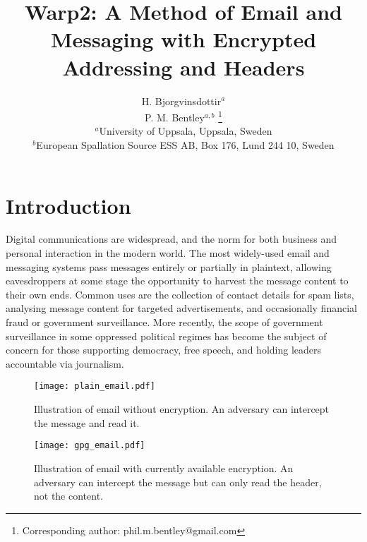 \pdfoutput=1 \documentclass{article}
\title{Warp2: A Method of Email and Messaging with Encrypted Addressing and Headers}
\author{H. Bjorgvinsdottir$^a$ \\
 P. M. Bentley$^{a,b}$ \thanks{Corresponding author: phil.m.bentley@gmail.com} \\
\small {$^a$}University of Uppsala, Uppsala, Sweden\\
\small {$^b$}European Spallation Source ESS AB, Box 176, Lund 244 10, Sweden\\
}
\begin{document}
\maketitle




\newpage
\section{Introduction}\label{sec:Introduction}
Digital communications are widespread, and the norm for both business and personal interaction in the modern world.  The most widely-used email and messaging systems pass messages entirely or partially in plaintext, allowing eavesdroppers at some stage the opportunity to harvest the message content to their own ends.  Common uses are the collection of contact details for spam lists, analysing message content for targeted advertisements, and occasionally financial fraud or government surveillance.  More recently, the scope of government surveillance in some oppressed political regimes has become the subject of concern for those supporting democracy, free speech, and holding leaders accountable via journalism.
\begin{figure}[hbt]
\centering
\texttt{[image: plain\_email.pdf]}
\caption{Illustration of email without encryption.  An adversary can intercept the message and read it.}
\label{fig:plainEmail}
\end{figure}
\begin{figure}
\centering
\texttt{[image: gpg\_email.pdf]}
\caption{Illustration of email with currently available encryption.  An adversary can intercept the message but can only read the header, not the content.}
\label{fig:gpgEmail}
\end{figure}
\end{document}
